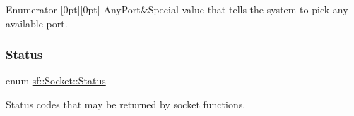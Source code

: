 \begin{DoxyEnumFields}{Enumerator}
[0pt][0pt]{}\mbox{\label{classsf_1_1_socket_aca9589996f3038a260724263b12caf71a5a3c30fd128895403afc11076f461b19}} 
Any\+Port&Special value that tells the system to pick any available port. \\
\hline

\end{DoxyEnumFields}
\mbox{\label{classsf_1_1_socket_a51bf0fd51057b98a10fbb866246176dc}} 
\subsubsection{\texorpdfstring{Status}{Status}}
{\footnotesize\ttfamily enum \hyperlink{classsf_1_1_socket_a51bf0fd51057b98a10fbb866246176dc}{sf\+::\+Socket\+::\+Status}}



Status codes that may be returned by socket functions. 

